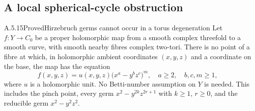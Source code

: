 \subsection{A local spherical-cycle obstruction}

\begin{statement}{A.5.15}{Proved}{Hirzebruch germs cannot occur in a torus degeneration}
Let $f:Y\to C_0$ be a proper holomorphic map from a
smooth complex threefold to a smooth curve, with smooth
nearby fibres complex two-tori. There is no point of
a fibre at which, in holomorphic ambient coordinates
$(x,y,z)$ and a coordinate on the base, the map has
the equation
\[
 f(x,y,z)=u(x,y,z)\bigl(x^a-y^bz^c\bigr)^m,
 \quad a\ge2,\quad b,c,m\ge1,                                    \tag{A.J.33}
\]
where $u$ is a holomorphic unit. No Betti-number
assumption on $Y$ is needed. This includes the pinch
point, every germ $x^2-y^{2k}z^{2r+1}$ with
$k\ge1$, $r\ge0$, and the reducible germ
$x^2-y^2z^2$.
\end{statement}
